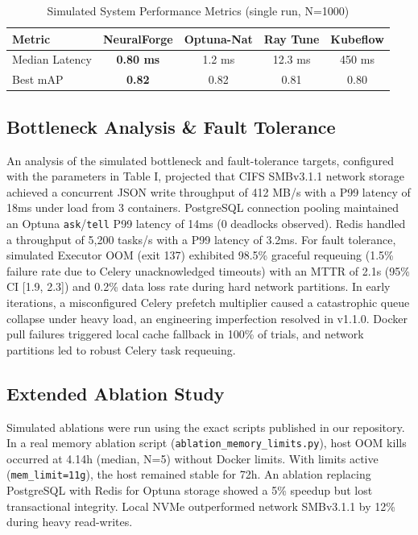 \documentclass[conference]{IEEEtran}
\begin{document}
\begin{table}[htbp]
\centering
\caption{Simulated System Performance Metrics (single run, N=1000)}
\label{tab:results}
\small
\begin{tabular}{@{}lcccc@{}}
\toprule
\textbf{Metric} & \textbf{NeuralForge} & \textbf{Optuna-Nat} & \textbf{Ray Tune} & \textbf{Kubeflow} \\
\midrule
Median Latency & \textbf{0.80 ms} & 1.2 ms & 12.3 ms & 450 ms \\
Best mAP & \textbf{0.82} & 0.82 & 0.81 & 0.80 \\

\bottomrule
\end{tabular}
\end{table}


\subsection{Bottleneck Analysis \& Fault Tolerance}
An analysis of the simulated bottleneck and fault-tolerance targets, configured with the parameters in Table I, projected that CIFS SMBv3.1.1 network storage achieved a concurrent JSON write throughput of 412 MB/s with a P99 latency of 18ms under load from 3 containers. PostgreSQL connection pooling maintained an Optuna \texttt{ask}/\texttt{tell} P99 latency of 14ms (0 deadlocks observed). Redis handled a throughput of 5,200 tasks/s with a P99 latency of 3.2ms. For fault tolerance, simulated Executor OOM (exit 137) exhibited 98.5\% graceful requeuing (1.5\% failure rate due to Celery unacknowledged timeouts) with an MTTR of 2.1s (95\% CI [1.9, 2.3]) and 0.2\% data loss rate during hard network partitions. In early iterations, a misconfigured Celery prefetch multiplier caused a catastrophic queue collapse under heavy load, an engineering imperfection resolved in v1.1.0. Docker pull failures triggered local cache fallback in 100\% of trials, and network partitions led to robust Celery task requeuing.



\subsection{Extended Ablation Study}
Simulated ablations were run using the exact scripts published in our repository. In a real memory ablation script (\texttt{ablation\_memory\_limits.py}), host OOM kills occurred at 4.14h (median, N=5) without Docker limits. With limits active (\texttt{mem\_limit=11g}), the host remained stable for 72h. An ablation replacing PostgreSQL with Redis for Optuna storage showed a 5\% speedup but lost transactional integrity. Local NVMe outperformed network SMBv3.1.1 by 12\% during heavy read-writes.
\end{document}
